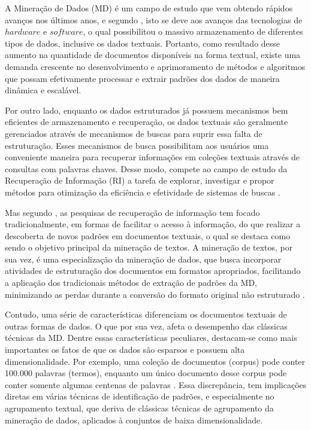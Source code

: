 A Mineração de Dados (MD) é um campo de estudo que vem obtendo rápidos avanços nos últimos anos, e
segundo , isto se deve aos avanços das tecnologias de $hardware$ e
$software$, o qual possibilitou o massivo armazenamento de diferentes tipos de dados, inclusive os
dados textuais. Portanto, como resultado desse aumento na quantidade de documentos disponíveis na
forma textual, existe uma demanda crescente no desenvolvimento e aprimoramento de métodos e
algoritmos que possam efetivamente processar e extrair padrões dos dados de maneira dinâmica e
escalável. 

Por outro lado, enquanto os dados estruturados já possuem mecanismos bem eficientes de armazenamento
e recuperação, os dados textuais são geralmente gerenciados através de mecanismos de buscas para
suprir essa falta de estruturação. Esses mecanismos de busca possibilitam aos usuários uma
conveniente maneira para recuperar informações em coleções textuais através de consultas com palavras
chaves. Desse modo, compete ao campo de estudo da Recuperação de Informação (RI) a tarefa de
explorar, investigar e propor métodos para otimização da eficiência e efetividade de
sistemas de buscas \cite{Baeza2011}. 

Mas segundo , as pesquisas de recuperação de informação tem focado
tradicionalmente, em formas de facilitar o acesso à informação, do que realizar a descoberta de novos
padrões em documentos textuais, o qual se destaca como sendo o objetivo principal da mineração de
textos. A mineração de textos, por sua vez, é uma especialização da mineração de dados, que busca
incorporar atividades de estruturação dos documentos em formatos apropriados, facilitando a
aplicação dos tradicionais métodos de extração de padrões da MD, minimizando as perdas durante a
conversão do formato original não estruturado \cite{Nogueira2013}.

Contudo, uma série de características diferenciam os documentos textuais de outras formas de dados.
O que por sua vez, afeta o desempenho das clássicas técnicas da MD.  Dentre essas características
peculiares, destacam-se como mais importantes os fatos de que os dados são esparsos e possuem alta
dimensionalidade. Por exemplo, uma coleção de documentos (corpus) pode conter 100.000 palavras (termos), enquanto um único documento desse corpus pode conter somente algumas centenas de palavras \cite{Aggarwal2012}.  Essa discrepância,
tem implicações diretas em várias técnicas de identificação de padrões, e especialmente no
agrupamento textual, que deriva de clássicas técnicas de agrupamento da mineração de dados,
aplicados à conjuntos de baixa dimensionalidade. 

